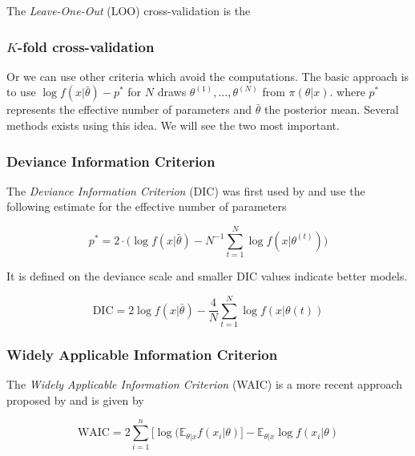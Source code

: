 \documentclass[11pt,a4paper,openany ]{book}
\begin{document}
The \emph{Leave-One-Out} (LOO) cross-validation is the 


\subsubsection*{$K$-fold cross-validation}

\citet{Vehtari_practical_2016}


Or we can use other criteria which avoid the computations. The basic approach is to use  $\log f(x|\bar{\theta})-p^*$ for $N$ draws $\theta^{(1)},\dots,\theta^{(N)}$ from $\pi(\theta|x)$. where $p^*$ represents the effective number of parameters and $\bar{\theta}$ the posterior mean. Several methods exists using this idea. We will see the two most important.

\subsubsection*{Deviance Information Criterion}

The \emph{Deviance Information Criterion}
(DIC) was first used by \citet{Spiegelhalter_bayesian_2002} and use the following estimate for the effective number of parameters 

\begin{equation}
p^*=2\cdot \bigg(\log f(x|\bar{\theta})-N^{-1}\sum_{t=1}^N\log f(x|\theta^{(t)})\bigg)
\end{equation}

It is defined on the deviance scale and smaller DIC values indicate better models.

\begin{equation}
\text{DIC}= 2\log f(x|\bar{\theta}) - \frac{4}{N} \sum_{t=1}^N\log f(x|\theta{(t)})
\end{equation}



\subsubsection*{Widely Applicable
Information Criterion}

The \emph{Widely Applicable Information Criterion} (WAIC) is a more recent approach proposed by \citet{Watanabe_asymptotic_2010} and is given by 


\begin{equation}
\text{WAIC}= 2 \sum_{i=1}^n\big[\log(\mathbb{E}_{\theta|x}f(x_i|\theta)\big]- \mathbb{E}_{\theta|x}\log f(x_i|\theta) 
\end{equation}
\end{document}
